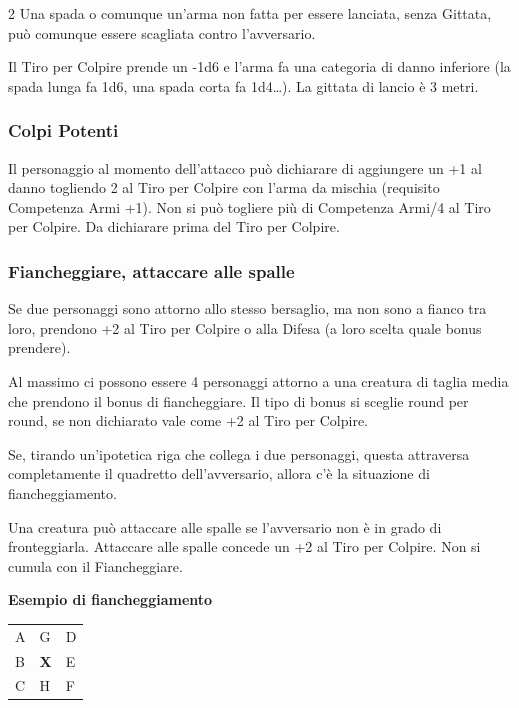 \begin{multicols}{2}
Una spada o comunque un'arma non fatta per essere lanciata, senza Gittata, può comunque essere scagliata contro l'avversario.

Il Tiro per Colpire prende un -1d6 e l'arma fa una categoria di danno inferiore (la spada lunga fa 1d6, una spada corta fa 1d4…). La gittata di lancio è 3 metri.

\subsubsection{Colpi Potenti}\label{colpipotenti}

Il personaggio al momento dell'attacco può dichiarare di aggiungere un +1 al danno togliendo 2 al Tiro per Colpire con l'arma da mischia (requisito Competenza Armi +1). Non si può togliere più di Competenza Armi/4 al Tiro per Colpire. Da dichiarare prima del Tiro per Colpire.

\subsubsection{Fiancheggiare, attaccare alle spalle}\hypertarget{fiancheggiare}{} \label{fiancheggiare}

Se due personaggi sono attorno allo stesso bersaglio, ma non sono a fianco tra loro, prendono +2 al Tiro per Colpire o alla Difesa (a loro scelta quale bonus prendere).

Al massimo ci possono essere 4 personaggi attorno a una creatura di taglia media che prendono il bonus di fiancheggiare. Il tipo di bonus si sceglie round per round, se non dichiarato vale come +2 al Tiro per Colpire.

Se, tirando un'ipotetica riga che collega i due personaggi, questa attraversa completamente il quadretto dell'avversario, allora c'è la situazione di fiancheggiamento.

Una creatura può attaccare alle spalle se l'avversario non è in grado di fronteggiarla. Attaccare alle spalle concede un +2 al Tiro per Colpire. Non si cumula con il Fiancheggiare.

\medskip

\textbf{Esempio di fiancheggiamento}

\medskip
\begin{center}

\begin{tabular}{lll}
\hline
\rowcolor{gray!20}A & G & D\\
B & \textbf{X} & E\\
\rowcolor{gray!20}C & H & F
\end{tabular}
\end{center}


\end{multicols}
